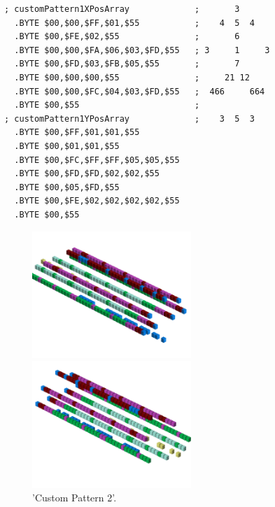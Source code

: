 \begin{minipage}[b]{0.46\linewidth}
\begin{lrbox}{\mybox}%
\begin{lstlisting}[basicstyle=\ttfamily\tiny]
; customPattern1XPosArray             ;       3      
  .BYTE $00,$00,$FF,$01,$55           ;    4  5  4   
  .BYTE $00,$FE,$02,$55               ;       6      
  .BYTE $00,$00,$FA,$06,$03,$FD,$55   ; 3     1     3
  .BYTE $00,$FD,$03,$FB,$05,$55       ;       7      
  .BYTE $00,$00,$00,$55               ;     21 12    
  .BYTE $00,$00,$FC,$04,$03,$FD,$55   ;  466     664 
  .BYTE $00,$55                       ;              
; customPattern1YPosArray             ;    3  5  3   
  .BYTE $00,$FF,$01,$01,$55
  .BYTE $00,$01,$01,$55
  .BYTE $00,$FC,$FF,$FF,$05,$05,$55
  .BYTE $00,$FD,$FD,$02,$02,$55
  .BYTE $00,$05,$FD,$55
  .BYTE $00,$FE,$02,$02,$02,$02,$55
  .BYTE $00,$55
\end{lstlisting}
\end{lrbox}%
\scalebox{0.8}{\usebox{\mybox}}

\end{minipage}
\begin{minipage}[b]{0.48\linewidth}
\begin{figure}[H]
    \centering
    \begin{adjustbox}{width=6cm,margin=0cm 0cm}
      \includegraphics[width=6cm]{src/patterns/pattern10-45.png}%
    \end{adjustbox}
    \begin{adjustbox}{width=6cm,margin=0cm -2cm}
      \includegraphics[width=6cm]{src/patterns/pattern10-225.png}%
    \end{adjustbox}
\caption{'Custom Pattern 2'.}
\end{figure}
\end{minipage}
